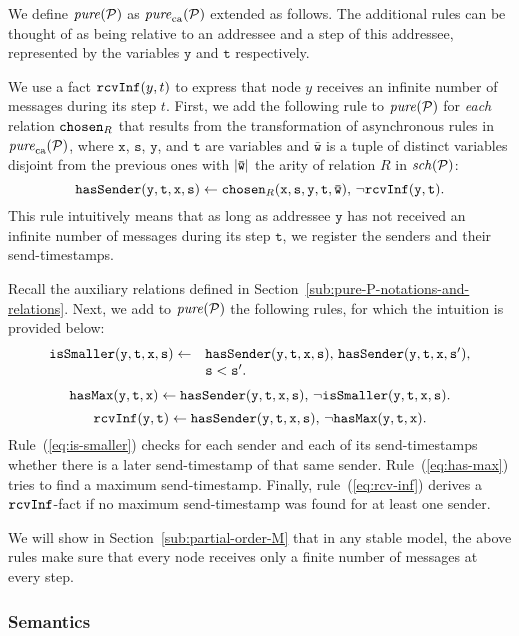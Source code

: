 \documentclass{tlp}
\newcommand{\ded}{\mathcal{P}}
\newcommand{\schof}[1]{\fname{sch}(#1)}
\newcommand{\var}[1]{\mathtt{#1}}
\newcommand{\tvar}[1]{\mathtt{\bar{#1}}}
\newcommand{\chosen}{\pred{chosen}}
\newcommand{\rcvinf}{\pred{rcvInf}}
\newcommand{\hasmax}{\pred{hasMax}}
\newcommand{\hassender}{\pred{hasSender}}
\newcommand{\purecaus}[1]{\fname{pure}_{\mathrm{ca}}(#1)}
\newcommand{\pure}[1]{\fname{pure}(#1)}
\begin{document}
\newcommand{\rulercvinf}[1]{\rcvinf(\var y,\var t)\gets\hassender(\var y,\var t,\var x,\var s),\,\neg\hasmax(\var y,\var t,\var x)#1}




We define $\pure{\ded}$ as $\purecaus{\ded}$ extended as follows.
The additional rules can be thought of as being relative to an addressee
and a step of this addressee, represented by the variables $\var y$
and $\var t$ respectively. 

We use a fact $\rcvinf(y,t)$ to express that node $y$ receives an
infinite number of messages during its step $t$. First, we add the
following rule to $\pure{\ded}$ for \emph{each} relation $\chosen_{R}$
that results from the transformation of asynchronous rules in $\purecaus{\ded}$,
where $\var x$, $\var s$, $\var y$, and $\var t$ are variables
and $\tvar w$ is a tuple of distinct variables disjoint from the
previous ones with $\len{\tvar w}$ the arity of relation $R$ in
$\schof{\ded}$: 
\begin{equation}
\rulehassender .\label{eq:has-sender}
\end{equation}
This rule intuitively means that as long as addressee $\var y$ has
not received an infinite number of messages during its step $\var t$,
we register the senders and their send-timestamps. 

Recall the auxiliary relations defined in Section~\ref{sub:pure-P-notations-and-relations}.
Next, we add to $\pure{\ded}$ the following rules, for which the
intuition is provided below:
\begin{equation}
\ruleissmaller .\label{eq:is-smaller}
\end{equation}
\begin{equation}
\rulehasmax .\label{eq:has-max}
\end{equation}
\begin{equation}
\rulercvinf .\label{eq:rcv-inf}
\end{equation}
Rule~(\ref{eq:is-smaller}) checks for each sender and each of its
send-timestamps whether there is a later send-timestamp of that same
sender. Rule~(\ref{eq:has-max}) tries to find a maximum send-timestamp.
Finally, rule~(\ref{eq:rcv-inf}) derives a $\rcvinf$-fact if no
maximum send-timestamp was found for at least one sender.

We will show in Section~\ref{sub:partial-order-M} that in any stable
model, the above rules make sure that every node receives only a finite
number of messages at every step. 


\subsubsection{Semantics}
\end{document}
